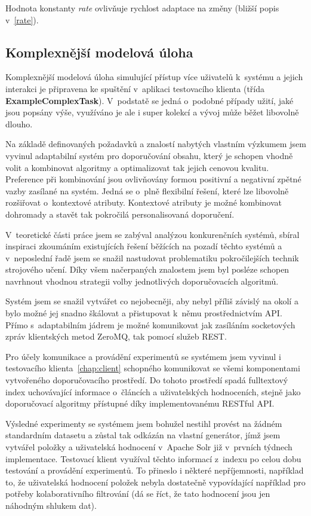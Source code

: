 \documentclass[thesis=M,czech]{FITthesis}[2014/05/07]
\begin{document}
Hodnota konstanty \emph{rate} ovlivňuje rychlost adaptace na změny (bližší popis v~\ref{rate}).

\subsection{Komplexnější modelová úloha}
Komplexnější modelová úloha simulující přístup více uživatelů k~systému a jejich interakci je připravena ke spuštění v~aplikaci testovacího klienta (třída \textbf{ExampleComplexTask}). V~podstatě se jedná o~podobné případy užití, jaké jsou popsány výše, využíváno je ale i super kolekcí a vývoj může běžet libovolně dlouho.

\begin{conclusion}
Na základě definovaných požadavků a znalostí nabytých vlastním výzkumem jsem vyvinul adaptabilní systém pro doporučování obsahu, který je schopen vhodně volit a kombinovat algoritmy a optimalizovat tak jejich cenovou kvalitu. Preference při kombinování jsou ovlivňovány formou positivní a negativní zpětné vazby zasílané na systém. Jedná se o~plně flexibilní řešení, které lze libovolně rozšiřovat o~kontextové atributy. Kontextové atributy je možné kombinovat dohromady a stavět tak pokročilá personalisovaná doporučení.

V~teoretické části práce jsem se zabýval analýzou konkurenčních systémů, sbíral inspiraci zkoumáním existujících řešení běžících na pozadí těchto systémů a v~neposlední řadě jsem se snažil nastudovat problematiku pokročilejších technik strojového učení. Díky všem načerpaných znalostem jsem byl posléze schopen navrhnout vhodnou strategii volby jednotlivých doporučovacích algoritmů.

Systém jsem se snažil vytvářet co nejobecněji, aby nebyl příliš závislý na okolí a bylo možné jej snadno škálovat a přistupovat k~němu prostřednictvím API. Přímo s~adaptabilním jádrem je možné komunikovat jak zasíláním socketových zpráv klientských metod ZeroMQ, tak pomocí služeb REST.

Pro účely komunikace a provádění experimentů se systémem jsem vyvinul i testovacího klienta~\ref{chap:client} schopného komunikovat se všemi komponentami vytvořeného doporučovacího prostředí. Do tohoto prostředí spadá fulltextový index uchovávající informace o~článcích a uživatelských hodnoceních, stejně jako doporučovací algoritmy přístupné díky implementovanému RESTful API.

Výsledné experimenty se systémem jsem bohužel nestihl provést na žádném standardním datasetu a zůstal tak odkázán na vlastní generátor, jímž jsem vytvářel položky a uživatelská hodnocení v~Apache Solr již v~prvních týdnech implementace. Testovací klient využíval těchto informací z~indexu po celou dobu testování a provádění experimentů. To přineslo i některé nepříjemnosti, například to, že uživatelská hodnocení položek nebyla dostatečně vypovídající například pro potřeby kolaborativního filtrování (dá se říct, že tato hodnocení jsou jen náhodným shlukem dat).


\end{conclusion}
\end{document}
